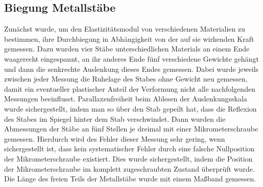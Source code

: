 \documentclass[
	a4paper,
	12pt,
	pagesize,
	ngerman
]{scrartcl}
\begin{document}
	\subsection{Biegung Metallstäbe} %
	Zunächst wurde, um den Elastizitätsmodul von verschiedenen Materialien zu bestimmen, ihre Durchbiegung in Abhängigkeit von der auf sie wirkenden Kraft gemessen. Dazu wurden vier Stäbe unterschiedlichen Materials an einem Ende waagerecht eingespannt, an ihr anderes Ende fünf verschiedene Gewichte gehängt und dann die senkrechte Auslenkung dieses Endes gemessen.
	Dabei wurde jeweils zwischen jeder Messung die Ruhelage des Stabes ohne Gewicht neu gemessen, damit ein eventueller plastischer Anteil der Verformung nicht alle nachfolgenden Messungen beeinflusst. Parallaxenfreiheit beim Ablesen der Auslenkungsskala wurde sichergestellt, indem man so über den Stab gepeilt hat, dass die Reflexion des Stabes im Spiegel hinter dem Stab verschwindet. %
	Dann wurden die Abmessungen der Stäbe an fünf Stellen je dreimal mit einer Mikrometerschraube  gemessen. Hierdurch wird des Fehler dieser Messung sehr gering, wenn sichergestellt ist, dass kein systematischer Fehler durch eine falsche Nullposition der Mikrometerschraube existiert. Dies wurde sichergestellt, indem die Position der Mikrometerschraube im komplett zugeschraubten Zustand überprüft wurde. Die Länge des freien Teils der Metallstäbe wurde mit einem Maßband gemessen.
	
\end{document}
